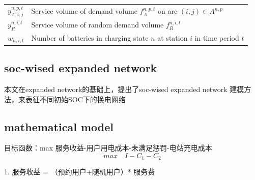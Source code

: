 \documentclass[12pt,hyperref,a4paper,UTF8]{ctexart}
\begin{document}
\begin{table}[!htbp]
\begin{tabular}{@{}lp{12cm}@{}}
    $y_{A,i,j}^{n,p,t}$ & Service volume of demand volume $f_{A}^{n,p,t}$ on arc $(i,j) \in A^{n,p}$ \\
    $y_{R}^{n,i,t}$ & Service volume of random demand volume $f_{R}^{n,i,t}$\\
    $w_{n,i,t}$ & Number of batteries in charging state $n$ at station $i$ in time period $t$ \\
    \bottomrule
  \end{tabular}
\end{table}


\subsection{soc-wised expanded network}
本文在expanded network的基础上，提出了soc-wised expanded network 建模方法，来表征不同初始SOC下的换电网络

\subsection{mathematical model}
目标函数：max 服务收益-用户用电成本-未满足惩罚-电站充电成本
\begin{equation}
max \quad I-C_1-C_2
\end{equation}

1. 服务收益 = （预约用户+随机用户）* 服务费
\end{document}
